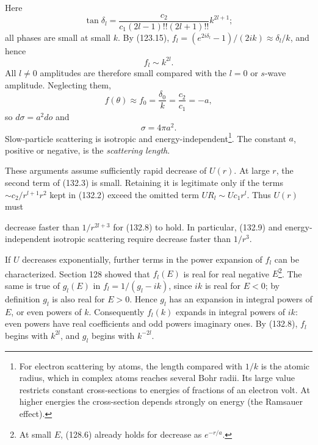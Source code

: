Here
\begin{equation}
 \tan\delta_l=\frac{c_2}{c_1(2l-1)!!(2l+1)!!}k^{2l+1}; \tag{132.7}
\end{equation}
all phases are small at small $k$. By (123.15),
$f_l=(e^{2i\delta_l}-1)/(2ik)\approx\delta_l/k$, and hence
\begin{equation}
 f_l\sim k^{2l}. \tag{132.8}
\end{equation}
All $l\ne0$ amplitudes are therefore small compared with the $l=0$ or
$s$-wave amplitude. Neglecting them,
\begin{equation}
 f(\theta)\approx f_0=\frac{\delta_0}{k}=\frac{c_2}{c_1}=-a, \tag{132.9}
\end{equation}
so $d\sigma=a^2do$ and
\begin{equation}
 \sigma=4\pi a^2. \tag{132.10}
\end{equation}
Slow-particle scattering is isotropic and energy-independent\footnote{For
electron scattering by atoms, the length compared with $1/k$ is the atomic
radius, which in complex atoms reaches several Bohr radii. Its large value
restricts constant cross-sections to energies of fractions of an electron
volt. At higher energies the cross-section depends strongly on energy (the
Ramsauer effect).}. The constant $a$, positive or negative, is the
\emph{scattering length}.

These arguments assume sufficiently rapid decrease of $U(r)$. At large $r$,
the second term of (132.3) is small. Retaining it is legitimate only if the
terms $\sim c_2/r^{l+1}r^2$ kept in (132.2) exceed the omitted term
$UR_l\sim Uc_1r^l$. Thus $U(r)$ must

decrease faster than $1/r^{2l+3}$ for (132.8) to hold. In particular, (132.9)
and energy-independent isotropic scattering require decrease faster than
$1/r^3$.

If $U$ decreases exponentially, further terms in the power expansion of
$f_l$ can be characterized. Section 128 showed that $f_l(E)$ is real for real
negative $E$\footnote{At small $E$, (128.6) already holds for decrease as
$e^{-r/a}$.}. The same is true of $g_l(E)$ in $f_l=1/(g_l-ik)$, since $ik$ is
real for $E<0$; by definition $g_l$ is also real for $E>0$. Hence $g_l$ has an
expansion in integral powers of $E$, or even powers of $k$. Consequently
$f_l(k)$ expands in integral powers of $ik$: even powers have real
coefficients and odd powers imaginary ones. By (132.8), $f_l$ begins with
$k^{2l}$, and $g_l$ begins with $k^{-2l}$.

